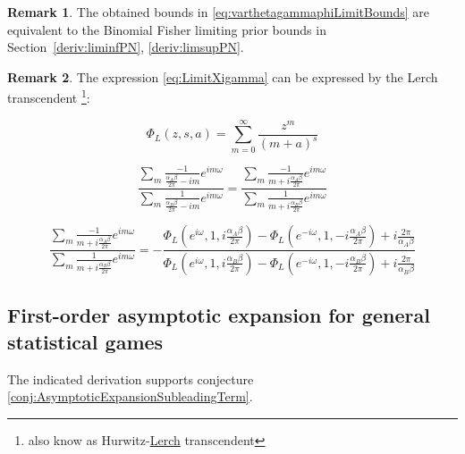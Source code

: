 \documentclass{article}
\theoremstyle{definition}
\newtheorem*{remark}{Remark}
\begin{document}
\begin{remark}
    The obtained bounds in \eqref{eq:varthetagammaphiLimitBounds} are equivalent to the Binomial Fisher limiting prior bounds in Section~\ref{deriv:liminfPN}, \ref{deriv:limsupPN}.
    
\end{remark}

\begin{remark}
    The expression \eqref{eq:LimitXigamma} can be expressed by the Lerch transcendent \cite{arxiv:JesusLerch,book:NISThandbook,book:HigherTranscendentalFunctions} \footnote{also know as Hurwitz-\href{https://mathshistory.st-andrews.ac.uk/Biographies/Lerch/}{Lerch} transcendent}:

    \begin{equation}
    \Phi_L(z,s,a) = \sum_{m=0}^\infty \frac{z^m}{(m+a)^s}
    \end{equation}

    \begin{equation}
    \frac{
    \sum_m \frac{-1}{\frac{\alpha_A \beta}{2 \pi} - i m} e^{i m \omega}
    }
    {
    \sum_m \frac{1}{\frac{\alpha_B \beta}{2 \pi} - i m} e^{i m \omega}
    } =
    \frac{
    \sum_m \frac{-1}{m + i \frac{\alpha_A \beta}{2 \pi}} e^{i m \omega}
    }
    {
    \sum_m \frac{1}{m + i \frac{ \alpha_B \beta}{2 \pi}} e^{i m \omega}
    }
    \end{equation}

    \begin{equation}
    \frac{
    \sum_m \frac{-1}{m + i \frac{\alpha_A \beta}{2 \pi}} e^{i m \omega}
    }
    {
    \sum_m \frac{1}{m + i \frac{ \alpha_B \beta}{2 \pi}} e^{i m \omega}
    } = 
    - \frac{
    \Phi_L(e^{i \omega},1,i \frac{\alpha_A \beta}{2 \pi}) - 
    \Phi_L(e^{-i \omega},1,-i \frac{\alpha_A \beta}{2 \pi}) +
    i \frac{2 \pi}{\alpha_A \beta}
    }{
    \Phi_L(e^{i \omega},1,i \frac{\alpha_B \beta}{2 \pi}) - 
    \Phi_L(e^{-i \omega},1,-i \frac{\alpha_B \beta}{2 \pi}) +
    i \frac{2 \pi}{\alpha_B \beta}
    }
    \end{equation}

\end{remark}

\subsection{First-order asymptotic expansion for general statistical games}

The indicated derivation supports conjecture \ref{conj:AsymptoticExpansionSubleadingTerm}.
\end{document}
